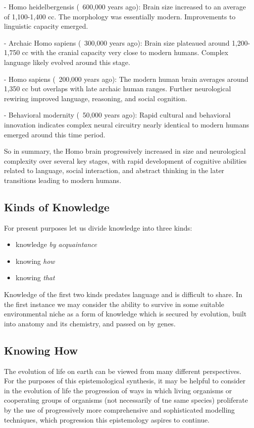 \documentclass[10pt,titlepage]{book}
\begin{document}
- Homo heidelbergensis (~600,000 years ago): Brain size increased to an average of 1,100-1,400 cc. The morphology was essentially modern. Improvements to linguistic capacity emerged.

- Archaic Homo sapiens (~300,000 years ago): Brain size plateaued around 1,200-1,750 cc with the cranial capacity very close to modern humans. Complex language likely evolved around this stage.

- Homo sapiens (~200,000 years ago): The modern human brain averages around 1,350 cc but overlaps with late archaic human ranges. Further neurological rewiring improved language, reasoning, and social cognition. 

- Behavioral modernity (~50,000 years ago): Rapid cultural and behavioral innovation indicates complex neural circuitry nearly identical to modern humans emerged around this time period.

So in summary, the Homo brain progressively increased in size and neurological complexity over several key stages, with rapid development of cognitive abilities related to language, social interaction, and abstract thinking in the later transitions leading to modern humans.

\subsection{Kinds of Knowledge}
For present purposes let us divide knowledge into three kinds:
\begin{itemize}
\item knowledge \emph{by acquaintance}
\item knowing \emph{how}
\item knowing \emph{that}
\end{itemize}

Knowledge of the first two kinds predates language and is difficult to share.
In the first instance we may consider the ability to survive in some suitable environmental niche as a form of knowledge which is secured by evolution, built into anatomy and its chemistry, and passed on by genes.

\subsection{Knowing How}

The evolution of life on earth can be viewed from many different perspectives.
For the purposes of this epistemological synthesis, it may be helpful to consider in the evolution of life the progression of ways in which living organisms or cooperating groups of organisms (not necessarily of tne same species) proliferate by the use of progressively more comprehensive and sophisticated modelling techniques, which progression this epistemology aspires to continue.
\end{document}
